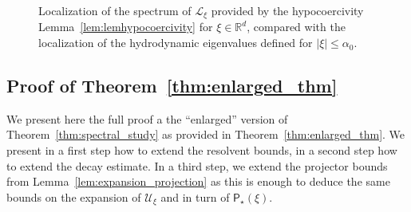 \documentclass[AHL,Unicode,longabstracts,published]{cedram}
\newcommand{\Inc}{\mathrm{inc}}
\newcommand{\Bou}{\mathrm{Bou}}
\newcommand{\R}{\mathbb{R}}
\newcommand{\LL}{\mathcal{L}}
\newcommand{\PP}{\mathsf{P}}
\newcommand{\UU}{\mathcal{U}}
\renewcommand*\le{\leqslant}
\begin{document}
\begin{figure}[h]
\centering


\caption{Localization of the spectrum of $\LL_\xi $ provided by the hypocoercivity Lemma~\ref{lem:lemhypocoercivity} for $\xi \in \R^d$, compared with the localization of the hydrodynamic eigenvalues defined for $|\xi| \le \alpha_0$.}
\end{figure}

\subsection{Proof of Theorem~\ref{thm:enlarged_thm}}

We present here the full proof a the ``enlarged'' version of Theorem~\ref{thm:spectral_study} as provided in Theorem~\ref{thm:enlarged_thm}. We present in a first step how to extend the resolvent bounds, in a second step how to extend the decay estimate. In a third step, we extend the projector bounds from Lemma~\ref{lem:expansion_projection} as this is enough to deduce the same bounds on the expansion of $\UU_\xi$ and in turn of $\PP_\star(\xi)$.
\end{document}
